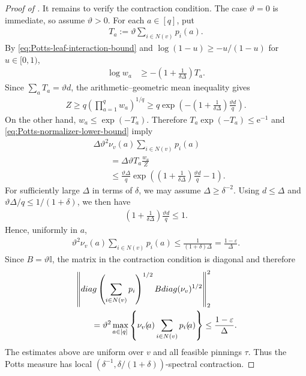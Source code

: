 \documentclass[10pt,a4paper]{amsart}
\newcommand{\e}{\mathrm{e}}
\renewcommand{\epsilon}{\varepsilon}
\newcommand{\norm}[1]{\left\Vert#1\right\Vert}
\newcommand{\set}[1]{\left\{#1\right\}}
\newcommand{\tp}{\tuple}
\newcommand{\tuple}[1]{\left(#1\right)}
\begin{document}
\begin{proof}[Proof of ]
It remains to verify the contraction condition.  The case
$\vartheta=0$ is immediate, so assume $\vartheta>0$.  For each
$\!a\in[q]$, put
\begin{align*}
  T_{\!a}:=\vartheta\sum_{i\in N(v)}p_i(\!a).
\end{align*}
By \eqref{eq:Potts-leaf-interaction-bound} and
$\log(1-u)\geq-u/(1-u)$ for $u\in[0,1)$,
\begin{align*}
  \log w_{\!a}
  &\geq
  -\tp{1+\frac1{\delta\Delta}}T_{\!a}.
\end{align*}
Since $\sum_{\!a}T_{\!a}=\vartheta d$, the arithmetic--geometric
mean inequality gives
\begin{align}
  Z
  \geq
  q\tp{\prod_{\!a=1}^q w_{\!a}}^{1/q}
  \geq
  q\exp\tp{
    -\tp{1+\frac1{\delta\Delta}}
    \frac{\vartheta d}{q}
  }.
  \label{eq:Potts-normalizer-lower-bound}
\end{align}
On the other hand, $w_{\!a}\leq\exp(-T_{\!a})$.  Therefore
$T_{\!a}\exp(-T_{\!a})\leq \e^{-1}$ and
\eqref{eq:Potts-normalizer-lower-bound} imply
\begin{align*}
  &\Delta\vartheta^2\nu_v(\!a)
    \sum_{i\in N(v)}p_i(\!a)
  \\
  &\qquad=
  \Delta\vartheta T_{\!a}\frac{w_{\!a}}Z
  \\
  &\qquad\leq
  \frac{\vartheta\Delta}{q}
  \exp\tp{
    \tp{1+\frac1{\delta\Delta}}
    \frac{\vartheta d}{q}-1
  }.
\end{align*}
For sufficiently large $\Delta$ in terms of $\delta$, we may assume
$\Delta\geq\delta^{-2}$.  Using $d\leq\Delta$ and
$\vartheta\Delta/q\leq1/(1+\delta)$, we then have
\begin{align*}
  \tp{1+\frac1{\delta\Delta}}
  \frac{\vartheta d}{q}
  \leq1.
\end{align*}
Hence, uniformly in $\!a$,
\begin{align*}
  \vartheta^2\nu_v(\!a)
  \sum_{i\in N(v)}p_i(\!a)
  \leq
  \frac1{(1+\delta)\Delta}
  =
  \frac{1-\epsilon}{\Delta}.
\end{align*}
Since $B=\vartheta\mathbb I$, the matrix in the contraction condition
is diagonal and therefore
\begin{align*}
  &\norm{
    \-{diag}\tp{\sum_{i\in N(v)}p_i}^{1/2}
    B
    \-{diag}(\nu_v)^{1/2}
  }_2^2
  \\
  &\qquad=
  \vartheta^2\max_{\!a\in[q]}\set{
    \nu_v(\!a)\sum_{i\in N(v)}p_i(\!a)
  }
  \leq
  \frac{1-\epsilon}{\Delta}.
\end{align*}
The estimates above are uniform over $v$ and all feasible pinnings
$\tau$.  Thus the Potts measure has local
$(\delta^{-1},\delta/(1+\delta))$-spectral contraction.


\end{proof}
\end{document}
